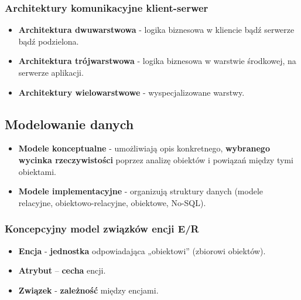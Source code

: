 \documentclass[a4paper]{article}
\begin{document}
\subsubsection{Architektury komunikacyjne klient-serwer}
\begin{itemize}
    \item \textbf{Architektura dwuwarstwowa} - logika biznesowa w kliencie bądź serwerze bądź podzielona.
    \item \textbf{Architektura trójwarstwowa} - logika biznesowa w warstwie środkowej, na serwerze aplikacji.
    \item \textbf{Architektury wielowarstwowe} - wyspecjalizowane warstwy.
\end{itemize}

\subsection{Modelowanie danych}
\begin{itemize}
    \item \textbf{Modele konceptualne} -  umożliwiają opis konkretnego, \textbf{wybranego wycinka rzeczywistości} poprzez analizę obiektów i powiązań między tymi obiektami.
    \item \textbf{Modele implementacyjne} - organizują struktury danych (modele relacyjne, obiektowo-relacyjne, obiektowe, No-SQL).
\end{itemize}

\subsubsection{Koncepcyjny model związków encji E/R}
\begin{itemize}
    \item \textbf{Encja} -  \textbf{jednostka} odpowiadająca „obiektowi” (zbiorowi obiektów).
    \item \textbf{Atrybut} – \textbf{cecha} encji.
    \item \textbf{Związek} - \textbf{zależność} między encjami.
\end{itemize}
\end{document}
